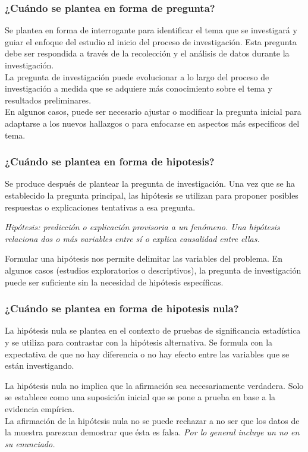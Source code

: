 \documentclass[
	11pt, %
]{beamer}
\begin{document}
\begin{frame}
  \frametitle{¿Cuándo se plantea en forma de pregunta?}
  \bigskip %
  Se plantea en forma de interrogante para identificar el tema que se investigará y guiar el enfoque del estudio al inicio del proceso de investigación. Esta pregunta debe ser respondida a través de la recolección y el análisis de datos durante la investigación.\\
  \bigskip %
  La pregunta de investigación puede evolucionar a lo largo del proceso de investigación a medida que se adquiere más conocimiento sobre el tema y resultados preliminares.\\
  \bigskip %
  En algunos casos, puede ser necesario ajustar o modificar la pregunta inicial para adaptarse a los nuevos hallazgos o para enfocarse en aspectos más especificos del tema.
  
\end{frame}


\begin{frame}
  \frametitle{¿Cuándo se plantea en forma de hipotesis?}
  \bigskip %

  Se produce después de plantear la pregunta de investigación. Una vez que se ha establecido la pregunta principal, las hipótesis se utilizan para proponer posibles respuestas o explicaciones tentativas a esa pregunta.

  \bigskip %

  \textit{Hipótesis: predicción o explicación provisoria a un fenómeno. Una hipótesis relaciona dos o más variables entre sí o explica causalidad entre ellas.}

  \bigskip %

  Formular una hipótesis nos permite delimitar las variables del problema. En algunos casos (estudios exploratorios o descriptivos), la pregunta de investigación puede ser suficiente sin la necesidad de hipótesis específicas.
  
\end{frame}

\begin{frame}
  \frametitle{¿Cuándo se plantea en forma de hipotesis nula?}
  \bigskip %
  La hipótesis nula se plantea en el contexto de pruebas de significancia estadística y se utiliza para contrastar con la hipótesis alternativa. Se formula con la expectativa de que no hay diferencia o no hay efecto entre las variables que se están investigando.
  \bigskip %

  La hipótesis nula no implica que la afirmación sea necesariamente verdadera. Solo se establece como una suposición inicial que se pone a prueba en base a la evidencia empírica.\\
  \bigskip %
  La afirmación de la hipótesis nula no se puede rechazar a no ser que los datos de la muestra parezcan demostrar que ésta es falsa. \textit{Por lo general incluye un no en su enunciado.}
  
  
\end{frame}
\end{document}
